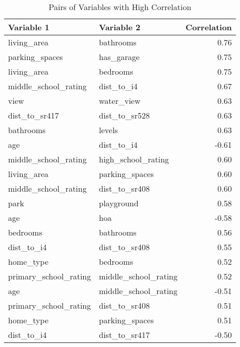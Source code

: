 \begin{table}
\caption{Pairs of Variables with High Correlation}
\label{tab:high_corr}
\begin{tabular}{llr}
\toprule
Variable 1 & Variable 2 & Correlation \\
\midrule
living\_area & bathrooms & 0.76 \\
parking\_spaces & has\_garage & 0.75 \\
living\_area & bedrooms & 0.75 \\
middle\_school\_rating & dist\_to\_i4 & 0.67 \\
view & water\_view & 0.63 \\
dist\_to\_sr417 & dist\_to\_sr528 & 0.63 \\
bathrooms & levels & 0.63 \\
age & dist\_to\_i4 & -0.61 \\
middle\_school\_rating & high\_school\_rating & 0.60 \\
living\_area & parking\_spaces & 0.60 \\
middle\_school\_rating & dist\_to\_sr408 & 0.60 \\
park & playground & 0.58 \\
age & hoa & -0.58 \\
bedrooms & bathrooms & 0.56 \\
dist\_to\_i4 & dist\_to\_sr408 & 0.55 \\
home\_type & bedrooms & 0.52 \\
primary\_school\_rating & middle\_school\_rating & 0.52 \\
age & middle\_school\_rating & -0.51 \\
primary\_school\_rating & dist\_to\_sr408 & 0.51 \\
home\_type & parking\_spaces & 0.51 \\
dist\_to\_i4 & dist\_to\_sr417 & -0.50 \\
\bottomrule
\end{tabular}
\end{table}
